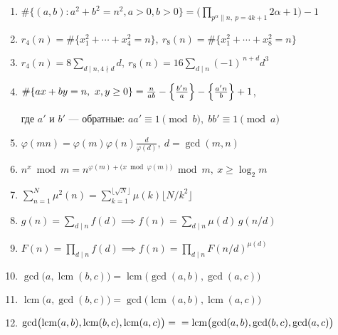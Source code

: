 \documentclass[9pt,a4paper,landscape,twosided]{extarticle}
\begin{document}
\begin{multicols*}{3}
\begin{enumerate}
\item %
$\displaystyle \#\{(a,b):a^2+b^2=n^2,a>0,b>0\}
=\Big(\prod_{p^\alpha\parallel n,\ p = 4k+1}2\alpha+1\Big)-1$

\item %
$r_4(n)=\#\{x_1^2+\cdots+x_4^2=n\},\ 
r_8(n)=\#\{x_1^2+\cdots+x_8^2=n\}$

\item %
$r_4(n)=8\sum_{d\mid n, 4\nmid d}d,\ 
r_8(n)=16\sum_{d\mid n}(-1)^{\,n+d}d^3$

\item %
$\#\{ax+by=n,\ x,y\ge0\}=\frac{n}{ab}-\Bigl\{\tfrac{b'n}{a}\Bigr\}-\Bigl\{\tfrac{a'n}{b}\Bigr\}+1$,

где $a'$ и $b'$ — обратные: $aa'\equiv1\pmod b,\; bb'\equiv1\pmod a$

\item %
$\varphi(mn)=\varphi(m)\varphi(n)\frac{d}{\varphi(d)},\  d=\gcd(m,n)$

\item %
$n^x\bmod m = n^{\varphi(m)+\bigl(x\bmod\varphi(m)\bigr)}\bmod m,\ x\ge\log_2 m$

\item %
$\sum_{n=1}^N\mu^2(n)=\sum_{k=1}^{\lfloor\sqrt N\rfloor}\mu(k)\bigl\lfloor N/k^2\bigr\rfloor$

\item %
$g(n)=\sum_{d\mid n}f(d) \implies f(n)=\sum_{d\mid n}\mu(d)\,g(n/d)$

\item %
$F(n)=\prod_{d\mid n}f(d) \implies f(n)=\prod_{d\mid n}F(n/d)^{\mu(d)}$

\item %
$\gcd\bigl(a,\operatorname{lcm}(b,c)\bigr)=\operatorname{lcm}\bigl(\gcd(a,b),\gcd(a,c)\bigr)$

\item %
$\operatorname{lcm}\bigl(a,\gcd(b,c)\bigr)=\gcd\bigl(\operatorname{lcm}(a,b),\operatorname{lcm}(a,c)\bigr)$

\item %
$\gcd\bigl(\operatorname{lcm}(a,b),\operatorname{lcm}(b,c),\operatorname{lcm}(a,c)\bigr)
 =\\= \operatorname{lcm}\bigl(\gcd(a,b),\gcd(b,c),\gcd(a,c)\bigr)$


\end{enumerate}
\end{multicols*}
\end{document}
